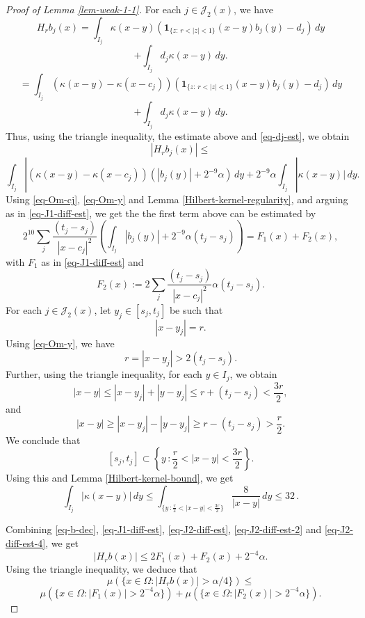 {\begin{proof}[Proof of Lemma \ref{lem-weak-1-1}]
For each $j\in \mathcal{J}_2(x)$, we have
$$
H_r b_j(x)=\int_{I_j} \kappa(x-y) (\mathbf{1}_{\{z:\, r<|z|<1\}}(x-y)b_j(y)-d_j)\, dy$$
$$+ \int_{I_j} d_j \kappa(x-y) \, dy.
$$
$$=\int_{I_j} (\kappa(x-y)-\kappa(x-c_j)) (\mathbf{1}_{\{z:\, r<|z|<1\}}(x-y)b_j(y)-d_j)\, dy$$
$$+ \int_{I_j} d_j \kappa(x-y) \, dy.$$
Thus, using the triangle inequality, the estimate above and \eqref{eq-dj-est}, we obtain
$$|H_r b_j(x)|\leq $$
\begin{equation}
    \label{eq-J2-diff-est}
    \int_{I_j} |(\kappa(x-y)-\kappa(x-c_j)) \left(|b_j(y)|+2^{-9}\alpha\right)\, dy +2^{-9}\alpha \int_{I_j}  |\kappa(x-y)| \, dy.
\end{equation}
Using \eqref{eq-Om-cj}, \eqref{eq-Om-y} and Lemma \ref{Hilbert-kernel-regularity}, and arguing as in \eqref{eq-J1-diff-est}, we get the the first term above can be estimated by
\begin{equation}
    \label{eq-J2-diff-est-2}
    2^{10}\sum_{j} \frac{(t_j-s_j)}{|x-c_j|^2}\left(\int_{I_j} |b_j(y)|+2^{-9} \alpha (t_j-s_j)\right)=F_1(x)+F_2(x),
\end{equation}
with $F_1$ as in \eqref{eq-J1-diff-est} and
\begin{equation}
    \label{eq-def-F2}
    F_2(x):= 2\sum_{j} \frac{(t_j-s_j)}{|x-c_j|^2} \alpha (t_j-s_j).
\end{equation}
For each $j\in \mathcal{J}_2(x)$, let $y_j\in [s_j, t_j]$ be such that
$$|x-y_j|=r.$$ Using \eqref{eq-Om-y}, we have
$$r=|x-y_j|>2(t_j-s_j).$$
Further, using the triangle inequality, for each $y\in I_j$, we obtain
$$|x-y|\leq |x-y_j|+|y-y_j|\leq r+(t_j-s_j)<\frac{3r}{2},$$
and
$$|x-y|\geq |x-y_j|-|y-y_j|\geq r-(t_j-s_j)>\frac{r}{2}.$$
We conclude that
$$[s_j, t_j]\subset \left\{y\,: \frac{r}{2}<|x-y|<\frac{3r}{2}\right\}.$$
Using this and Lemma \ref{Hilbert-kernel-bound}, we get
\begin{equation}
    \label{eq-J2-diff-est-4}
    \int_{I_j}|\kappa(x-y)|\,dy \leq \int_{\{y\,: \frac{r}{2}<|x-y|<\frac{3r}{2}\}}\frac{8}{|x-y|}\, dy\leq 32\,.
\end{equation}

Combining \eqref{eq-b-dec}, \eqref{eq-J1-diff-est}, \eqref{eq-J2-diff-est}, \eqref{eq-J2-diff-est-2} and \eqref{eq-J2-diff-est-4}, we get
\begin{equation*}
    |H_rb(x)|\leq 2F_1(x)+F_2(x)+2^{-4}\alpha.
\end{equation*}
Using the triangle inequality, we deduce that
$$\mu({\{x\in \Omega: |H_r b(x)|>\alpha/4\}})\leq $$
\begin{equation}
    \label{eq-set-dec-3}
    \mu(\{x\in \Omega: |F_1(x)|> 2^{-4} \alpha\})+\mu(\{x\in \Omega: | F_2(x)|> 2^{-4}\alpha\}).
\end{equation}


\end{proof}}

